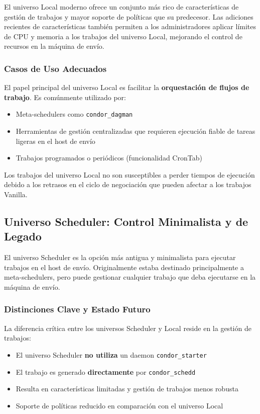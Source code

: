 El universo Local moderno ofrece un conjunto más rico de características de gestión de trabajos y mayor soporte de políticas que su predecesor. Las adiciones recientes de características también permiten a los administradores aplicar límites de CPU y memoria a los trabajos del universo Local, mejorando el control de recursos en la máquina de envío.

\subsubsection{Casos de Uso Adecuados}

El papel principal del universo Local es facilitar la \textbf{orquestación de flujos de trabajo}. Es comúnmente utilizado por:

\begin{itemize}
	\item Meta-schedulers como \texttt{condor\_dagman}
	\item Herramientas de gestión centralizadas que requieren ejecución fiable de tareas ligeras en el host de envío
	\item Trabajos programados o periódicos (funcionalidad CronTab)
\end{itemize}

Los trabajos del universo Local no son susceptibles a perder tiempos de ejecución debido a los retrasos en el ciclo de negociación que pueden afectar a los trabajos Vanilla.

\subsection{Universo Scheduler: Control Minimalista y de Legado}

El universo Scheduler es la opción más antigua y minimalista para ejecutar trabajos en el host de envío. Originalmente estaba destinado principalmente a meta-schedulers, pero puede gestionar cualquier trabajo que deba ejecutarse en la máquina de envío.

\subsubsection{Distinciones Clave y Estado Futuro}

La diferencia crítica entre los universos Scheduler y Local reside en la gestión de trabajos:

\begin{itemize}
	\item El universo Scheduler \textbf{no utiliza} un daemon \texttt{condor\_starter}
	\item El trabajo es generado \textbf{directamente} por \texttt{condor\_schedd}
	\item Resulta en características limitadas y gestión de trabajos menos robusta
	\item Soporte de políticas reducido en comparación con el universo Local
\end{itemize}

